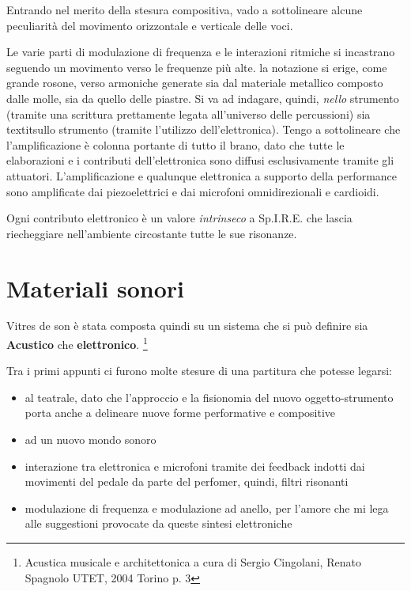 Entrando nel merito della stesura compositiva, vado a sottolineare alcune peculiarità del movimento orizzontale e verticale delle voci.

Le varie parti di modulazione di frequenza e le interazioni ritmiche si incastrano seguendo un movimento verso le frequenze più alte.  la notazione si erige, come grande rosone, verso armoniche generate sia dal materiale metallico composto dalle molle, sia da quello delle piastre. Si va ad indagare, quindi, \textit{nello} strumento (tramite una scrittura prettamente legata all'universo delle percussioni) sia textit{sullo} strumento (tramite l'utilizzo dell'elettronica). Tengo a sottolineare che l'amplificazione è colonna portante di tutto il brano, dato che tutte le elaborazioni e i contributi dell'elettronica sono diffusi esclusivamente tramite gli attuatori. L'amplificazione e qualunque elettronica a supporto della performance sono amplificate dai piezoelettrici e dai microfoni omnidirezionali e cardioidi.

Ogni contributo elettronico è un valore \textit{intrinseco} a Sp.I.R.E. che lascia riecheggiare nell'ambiente circostante tutte le sue risonanze.

\section{Materiali sonori}

Vitres de son è stata composta quindi su un sistema che si può definire sia \textbf{Acustico} che \textbf{elettronico}. \footnote{Acustica musicale e architettonica a cura di Sergio Cingolani, Renato Spagnolo UTET, 2004 Torino p. 3}

Tra i primi appunti ci furono molte stesure di una partitura che potesse legarsi:

\begin{itemize}
\item{al teatrale, dato che l'approccio e la fisionomia del nuovo oggetto-strumento porta anche a delineare nuove forme performative e compositive}
\item{ad un nuovo mondo sonoro}
\item{interazione tra elettronica e microfoni tramite dei feedback indotti dai movimenti del pedale da parte del perfomer, quindi, filtri risonanti}
\item{modulazione di frequenza e modulazione ad anello, per l'amore che mi lega alle suggestioni provocate da queste sintesi elettroniche}
\end{itemize}

